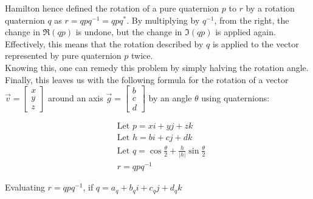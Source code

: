 \documentclass[12pt, a4paper]{article}
\begin{document}
Hamilton hence defined the rotation of a pure quaternion $p$ to $r$ by a
rotation quaternion $q$ as $r = qpq^{-1} = qpq^*$. By multiplying by $q^{-1}$, from the
right, the change in $\Re(qp)$ is undone, but the change in $\Im(qp)$ is applied
again. Effectively, this means that the rotation described by $q$ is applied to
the vector represented by pure quaternion $p$ twice. \\

Knowing this, one can remedy this problem by simply halving the rotation angle.
Finally, this leaves us with the following formula for the rotation of a vector
$\vec{v} = \begin{bmatrix} x \\
    y \\
    z
\end{bmatrix}$ around an axis $\vec{g} = \begin{bmatrix}
    b \\
    c \\
    d
\end{bmatrix}$ by an angle $\theta$ using quaternions:

\begin{align*}
    &\text{Let } p = xi + yj + zk \\
    &\text{Let } h = bi + cj + dk \\
    &\text{Let } q = \cos\frac{\theta}{2} + \frac{h}{|h|}\sin\frac{\theta}{2} \\
    &r = qpq^{-1}
\end{align*}

Evaluating $r = qpq^{-1}$, if $q = a_q + b_qi + c_qj + d_qk$
\end{document}
